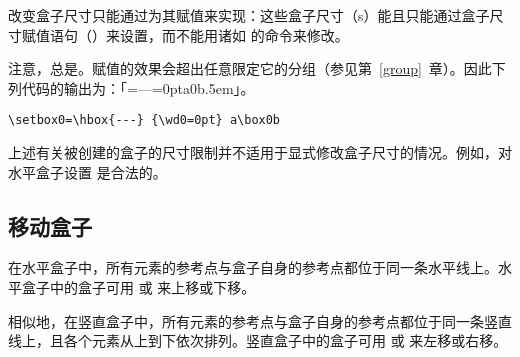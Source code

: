 \documentclass{book}
\begin{document}
改变盒子尺寸只能通过为其赋值来实现：这些盒子尺寸（s）能且只能通过盒子尺寸赋值语句（）来设置，而不能用诸如  的命令来修改。

注意，总是。赋值的效果会超出任意限定它的分组（参见第~\ref{group}~章）。因此下列代码的输出为：「{=\hbox{---}{=0pt}a\box0b}\kern.5em」。
\begin{verbatim}
\setbox0=\hbox{---} {\wd0=0pt} a\box0b
\end{verbatim}

上述有关被创建的盒子的尺寸限制并不适用于显式修改盒子尺寸的情况。例如，对水平盒子设置  是合法的。

\subsection{移动盒子}

在水平盒子中，所有元素的参考点与盒子自身的参考点都位于同一条水平线上。水平盒子中的盒子可用  或  来上移或下移。

相似地，在竖直盒子中，所有元素的参考点与盒子自身的参考点都位于同一条竖直线上，且各个元素从上到下依次排列。竖直盒子中的盒子可用  或  来左移或右移。
\end{document}
